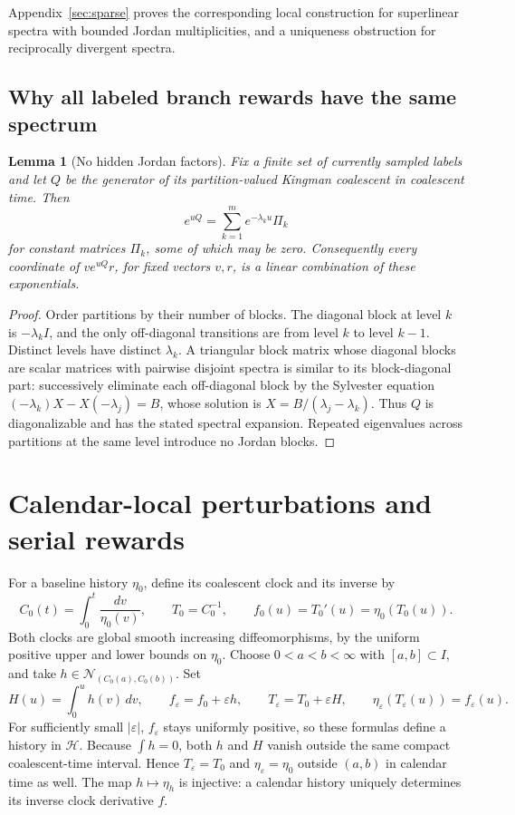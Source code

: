 \documentclass[11pt]{article}
\newtheorem{lemma}[theorem]{Lemma}
\theoremstyle{definition}
\theoremstyle{remark}
\numberwithin{equation}{section}
\begin{document}
Appendix~\ref{sec:sparse} proves the corresponding local construction for
superlinear spectra with bounded Jordan multiplicities, and a uniqueness
obstruction for reciprocally divergent spectra.

\subsection{Why all labeled branch rewards have the same spectrum}

\begin{lemma}[No hidden Jordan factors]\label{phy:semisimple}
Fix a finite set of currently sampled labels and let $Q$ be the
generator of its partition-valued Kingman coalescent in coalescent
time. Then
\[
                   e^{uQ}=\sum_{k=1}^m e^{-\lambda_k u}\Pi_k
\]
for constant matrices $\Pi_k$, some of which may be zero.
Consequently every coordinate of $v e^{uQ}r$, for fixed vectors
$v,r$, is a linear combination of these exponentials.
\end{lemma}
\begin{proof}
Order partitions by their number of blocks. The diagonal block at
level $k$ is $-\lambda_k I$, and the only off-diagonal transitions
are from level $k$ to level $k-1$. Distinct levels have distinct
$\lambda_k$. A triangular block matrix whose diagonal blocks are
scalar matrices with pairwise disjoint spectra is similar to its
block-diagonal part: successively eliminate each off-diagonal block
by the Sylvester equation
$(-\lambda_k)X-X(-\lambda_j)=B$, whose solution is
$X=B/(\lambda_j-\lambda_k)$. Thus $Q$ is diagonalizable and has the
stated spectral expansion. Repeated eigenvalues across partitions
at the same level introduce no Jordan blocks.
\end{proof}

\section{Calendar-local perturbations and serial rewards}
\label{sec:gap}

For a baseline history $\eta_0$, define its coalescent clock and its
inverse by
\[
 C_0(t)=\int_0^t\frac{dv}{\eta_0(v)},\qquad
 T_0=C_0^{-1},\qquad f_0(u)=T_0'(u)=\eta_0(T_0(u)).
\]
Both clocks are global smooth increasing diffeomorphisms, by the
uniform positive upper and lower bounds on $\eta_0$.
Choose $0<a<b<\infty$ with $[a,b]\subset I$, and take
$h\in\mathcal N_{(C_0(a),C_0(b))}$. Set
\[
 H(u)=\int_0^u h(v)\,dv,\qquad
 f_\varepsilon=f_0+\varepsilon h,\qquad
 T_\varepsilon=T_0+\varepsilon H,
 \qquad \eta_\varepsilon(T_\varepsilon(u))=f_\varepsilon(u).
\]
For sufficiently small $|\varepsilon|$, $f_\varepsilon$ stays uniformly
positive, so these formulas define a history in $\mathcal H$.
Because $\int h=0$, both $h$ and $H$ vanish outside the same compact
coalescent-time interval. Hence $T_\varepsilon=T_0$ and
$\eta_\varepsilon=\eta_0$ outside $(a,b)$ in calendar time as well.
The map $h\mapsto\eta_h$ is injective: a calendar history uniquely
determines its inverse clock derivative $f$.
\end{document}
